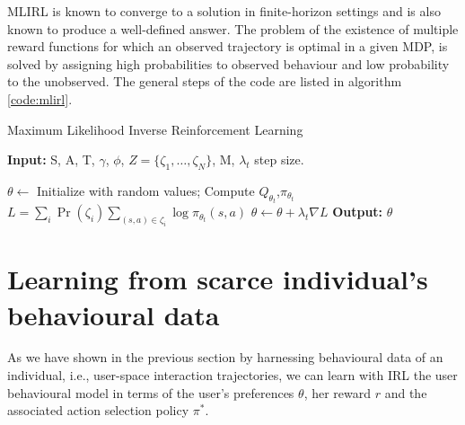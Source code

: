 MLIRL is known to converge to a solution in finite-horizon settings and is also known to produce a well-defined answer. The problem of the existence of multiple reward functions for which an observed trajectory is optimal in a given MDP, is solved by assigning high probabilities to observed behaviour and low probability to the unobserved. The general steps of the code are listed in algorithm \ref{code:mlirl}.

\begin{algorithm}
	\caption{Maximum Likelihood Inverse Reinforcement Learning}
	\label{code:mlirl}
	\begin{algorithmic}
		\State \textbf{Input:} S, A, T, $\gamma$, $\phi$, $Z=\lbrace \zeta_1, \dots,  \zeta_N \rbrace$, M, $\lambda_t$ step size.
		
		\State $\theta \leftarrow$ Initialize with random values;
		\State Compute $Q_{\theta_t}$,$\pi_{\theta_t}$
		\State $L = \sum_{i} \Pr{(\zeta_i)} \sum_{(s,a) \in \zeta_i} \log{\pi_{\theta_t}(s,a)}$
		\State $\theta \leftarrow \theta + \lambda_t\nabla{L}$
		\EndFor
		\State \textbf{Output:}  $\theta$
	\end{algorithmic}
\end{algorithm}

\section{Learning from scarce individual's behavioural data}
\label{sec:clustering like behaving users}

As we have shown in the previous section by harnessing behavioural data of an individual, i.e., user-space interaction trajectories, we can learn with IRL the user behavioural model in terms of the user's preferences $\theta$, her reward $r$ and the associated action selection policy $\pi^*$. 

